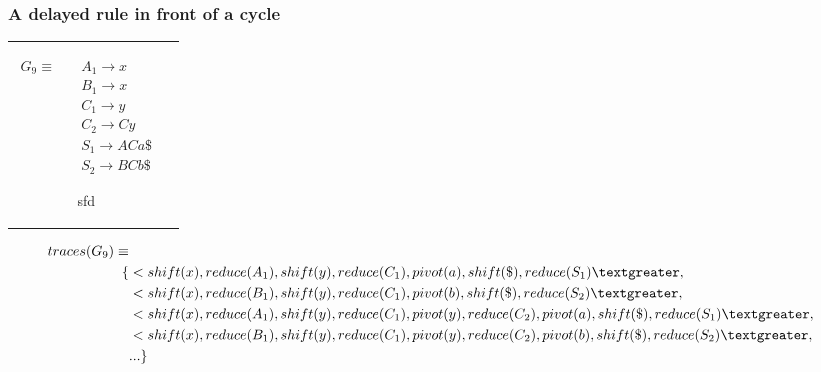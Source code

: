 \documentclass[11pt]{article}
\begin{document}



\subsubsection{A delayed rule in front of a cycle}
\begin{tabular}[t]{cl}
\parbox{.3\textwidth}{
\begin{align*}
G_9 \equiv \quad & A_1 \rightarrow x\\
                 & B_1 \rightarrow x\\
                 & C_1 \rightarrow y\\
                 & C_2 \rightarrow C y\\
                 & S_1 \rightarrow A C a \$\\
                 & S_2 \rightarrow B C b \$
\end{align*}}
\parbox{.8\textwidth}{sfd}
\end{tabular}

\begin{align*}
traces(G_9) \equiv \\
\{ & \textless shift(x), reduce(A_1), shift(y), reduce(C_1), pivot(a), shift(\$), reduce(S_1) \textgreater,\\
                      & \textless shift(x), reduce(B_1), shift(y), reduce(C_1), pivot(b), shift(\$), reduce(S_2) \textgreater,\\
                      & \textless shift(x), reduce(A_1), shift(y), reduce(C_1), pivot(y), reduce(C_2), pivot(a), shift(\$), reduce(S_1) \textgreater,\\
                      & \textless shift(x), reduce(B_1), shift(y), reduce(C_1), pivot(y), reduce(C_2), pivot(b), shift(\$), reduce(S_2) \textgreater,\\
                      & ... \}
\end{align*}
\end{document}
